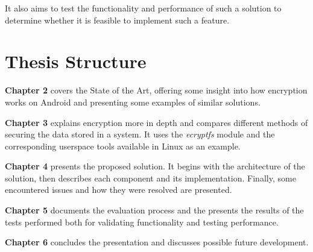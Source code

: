 It also aims to test the functionality and performance of such a solution to determine whether it is feasible to implement such a feature.

\section{Thesis Structure}
\label{sec:summ-intro}

\textbf{Chapter 2} covers the State of the Art, offering some insight into how encryption works on Android and presenting some examples of similar solutions.

\textbf{Chapter 3} explains encryption more in depth and compares different methods of securing the data stored in a system. It uses the \textit{ecryptfs} module and the corresponding userspace tools available in Linux as an example.

\textbf{Chapter 4} presents the proposed solution. It begins with the architecture of the solution, then describes each component and its implementation. Finally, some encountered issues and how they were resolved are presented.

\textbf{Chapter 5} documents the evaluation process and the presents the results of the tests performed both for validating functionality and testing performance.

\textbf{Chapter 6} concludes the presentation and discusses possible future development.
